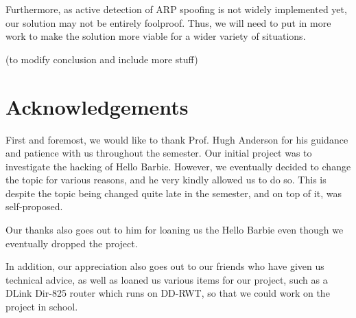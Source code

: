 \documentclass{acm_proc_article-sp}
\begin{document}
Furthermore, as active detection of ARP spoofing is not widely implemented yet, our solution may not be entirely foolproof. Thus, we will need to put in more work to make the solution more viable for a wider variety of situations. 

(to modify conclusion and include more stuff) 

\section{Acknowledgements}
First and foremost, we would like to thank Prof. Hugh Anderson for his guidance and patience with us throughout the semester. Our initial project was to investigate the hacking of Hello Barbie. However, we eventually decided to change the topic for various reasons, and he very kindly allowed us to do so. This is despite the topic being changed quite late in the semester, and on top of it, was self-proposed. 

Our thanks also goes out to him for loaning us the Hello Barbie even though we eventually dropped the project. 

In addition, our appreciation also goes out to our friends who have given us technical advice, as well as loaned us various items for our project, such as a DLink Dir-825 router which runs on DD-RWT, so that we could work on the project in school. 

%

%
% 
\end{document}
